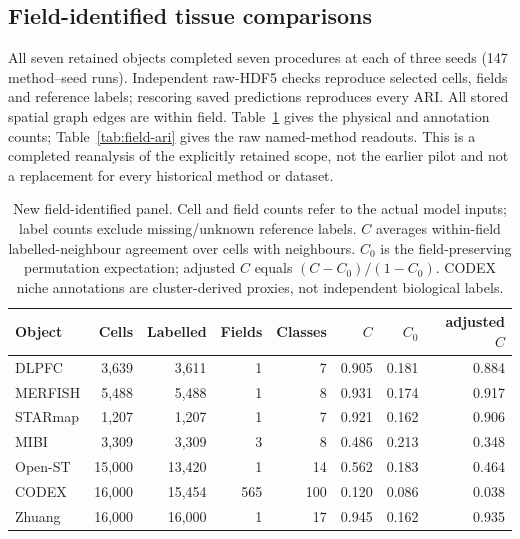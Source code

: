 \subsection{Field-identified tissue comparisons}\label{sec:field}

All seven retained objects completed seven procedures at each of three seeds (147 method--seed runs). Independent raw-HDF5 checks reproduce selected cells, fields and reference labels; rescoring saved predictions reproduces every ARI. All stored spatial graph edges are within field. Table~\ref{tab:field-inputs} gives the physical and annotation counts; Table~\ref{tab:field-ari} gives the raw named-method readouts. This is a completed reanalysis of the explicitly retained scope, not the earlier pilot and not a replacement for every historical method or dataset.

\begin{table}[!htbp]\centering\small

\caption{New field-identified panel. Cell and field counts refer to the actual model inputs; label counts exclude missing/unknown reference labels. $C$ averages within-field labelled-neighbour agreement over cells with neighbours. $C_0$ is the field-preserving permutation expectation; adjusted $C$ equals $(C-C_0)/(1-C_0)$. CODEX niche annotations are cluster-derived proxies, not independent biological labels.}

\label{tab:field-inputs}

\begin{tabular}{lrrrrrrr}\toprule

Object & Cells & Labelled & Fields & Classes & $C$ & $C_0$ & adjusted $C$\\\midrule

DLPFC & 3,639 & 3,611 & 1 & 7 & 0.905 & 0.181 & 0.884\\

MERFISH & 5,488 & 5,488 & 1 & 8 & 0.931 & 0.174 & 0.917\\

STARmap & 1,207 & 1,207 & 1 & 7 & 0.921 & 0.162 & 0.906\\

MIBI & 3,309 & 3,309 & 3 & 8 & 0.486 & 0.213 & 0.348\\

Open-ST & 15,000 & 13,420 & 1 & 14 & 0.562 & 0.183 & 0.464\\

CODEX & 16,000 & 15,454 & 565 & 100 & 0.120 & 0.086 & 0.038\\

Zhuang & 16,000 & 16,000 & 1 & 17 & 0.945 & 0.162 & 0.935\\

\bottomrule\end{tabular}\end{table}

